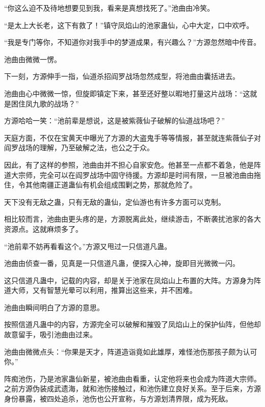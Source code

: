 
\begin{this_body}



“你这么迫不及待地想要见到我，看来是真想找死了。”池曲由冷笑。

“是太上大长老，这下有救了！”镇守凤焰山的池家蛊仙，心中大定，口中欢呼。

“我是专门等你，不知道你对我手中的梦道成果，有兴趣么？”方源忽然暗中传音。

池曲由微微一愣。

下一刻，方源伸手一指，仙道杀招阎罗战场忽然成型，将池曲由囊括进去。

池曲由心中微微一惊，但旋即镇定下来，甚至还好整以暇地打量这片战场：“这就是困住凤九歌的战场？”

方源哈哈一笑：“池前辈是想说，这是被紫薇仙子破解的仙道战场吧？”

天庭方面，不仅在宝黄天中曝光了方源的大盗鬼手等等情报，甚至就连紫薇仙子对阎罗战场的理解，乃至破解之法，也公之于众。

因此，有了这样的参照，池曲由并不担心自家安危。他甚至一点都不着急，他是阵道大宗师，完全可以在阎罗战场中固守待援。方源却是时间有限，一旦被池曲由拖住，令其他南疆正道蛊仙有机会组成围剿之势，那就危险了。

天下没有无敌之蛊，只有无敌的蛊仙，定仙游也有许多方面可以克制。

相比较而言，池曲由更头疼的是，方源脱离此处，继续游击，不断袭扰池家的各大资源点。这就麻烦多了。

“池前辈不妨再看看这个。”方源又甩过一只信道凡蛊。

池曲由侦查一番，见真是一只信道凡蛊，便探入心神，旋即目光微微一闪。

这只信道凡蛊中，记载的内容，却是关于池家在凤焰山上布置的大阵。方源身为阵道大师，又有智慧光晕可以利用，推算出这些来，并不困难。

池曲由瞬间明白了方源的意思。

按照信道凡蛊中的内容，方源完全可以破解和摧毁了凤焰山上的保护仙阵，但他却故意留手，吸引池曲由过来。

池曲由微微点头：“你果是天才，阵道造诣竟如此雄厚，难怪池伤那孩子颇为认可你。”

阵痴池伤，乃是池家蛊仙新星，被池曲由看重，认定他将来也会成为阵道大宗师。之前方源伪装成武遗海，就和池伤接触过，和池伤建立良好关系。至于后来，方源身份暴露，被四处追杀，池伤也公开宣称，与方源划清界限，成为死敌。


\end{this_body}
